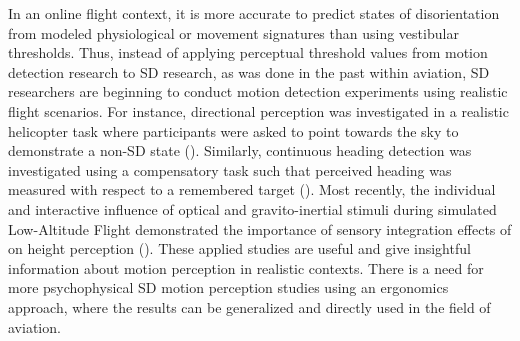 \documentclass[11pt, onecolumn]{article}
\begin{document}
In an online flight context, it is more accurate to predict states of disorientation from modeled physiological or movement signatures than using vestibular thresholds.  Thus, instead of applying perceptual threshold values from motion detection research to SD research, as was done in the past within aviation, SD researchers are beginning to conduct motion detection experiments using realistic flight scenarios.  For instance, directional perception was investigated in a realistic helicopter task where participants were asked to point towards the sky to demonstrate a non-SD state (\cite{Cheung_2000_Disorientation}).  Similarly, continuous heading detection was investigated using a compensatory task such that perceived heading was measured with respect to a remembered target (\cite{Sargent_2008_Disorientation}).  Most recently, the individual and interactive influence of optical and gravito-inertial stimuli during simulated Low-Altitude Flight demonstrated the importance of sensory integration effects of on height perception (\cite{Denquin_2021_LAF}).  These applied studies are useful and give insightful information about motion perception in realistic contexts.  There is a need for more psychophysical SD motion perception studies using an ergonomics approach, where the results can be generalized and directly used in the field of aviation.
\end{document}
